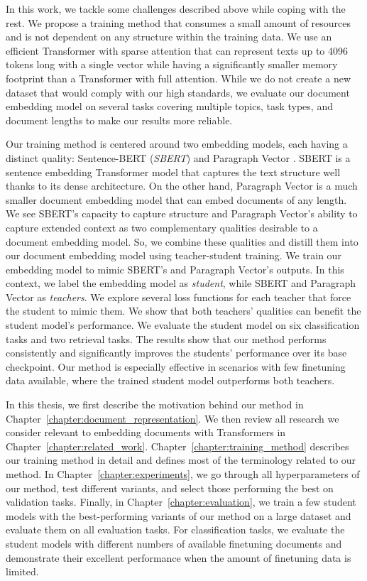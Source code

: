 In this work, we tackle some challenges described above while coping with the
rest. We propose a training method that consumes a small amount of resources
and is not dependent on any structure within the training data. We use an
efficient Transformer with sparse attention that can represent texts up to 4096
tokens long with a single vector while having a significantly smaller memory
footprint than a Transformer with full attention. While we do not create a new
dataset that would comply with our high standards, we evaluate our document
embedding model on several tasks covering multiple topics, task types, and
document lengths to make our results more reliable.

Our training method is centered around two embedding models, each having a
distinct quality: Sentence-BERT (\emph{SBERT}) \citep{reimers2019sentence} and
Paragraph Vector \citep{le2014distributed}. SBERT is a sentence embedding
Transformer model that captures the text structure well thanks to its dense
architecture. On the other hand, Paragraph Vector is a much smaller document
embedding model that can embed documents of any length. We see SBERT's capacity
to capture structure and Paragraph Vector's ability to capture extended context
as two complementary qualities desirable to a document embedding model. So, we
combine these qualities and distill them into our document embedding model
using teacher-student training. We train our embedding model to mimic SBERT's
and Paragraph Vector's outputs. In this context, we label the embedding model
as \emph{student}, while SBERT and Paragraph Vector as \emph{teachers}. We
explore several loss functions for each teacher that force the student to mimic
them. We show that both teachers' qualities can benefit the student model's
performance. We evaluate the student model on six classification tasks and two
retrieval tasks. The results show that our method performs consistently and
significantly improves the students' performance over its base checkpoint. Our
method is especially effective in scenarios with few finetuning data available,
where the trained student model outperforms both teachers.

In this thesis, we first describe the motivation behind our method in
Chapter~\ref{chapter:document_representation}. We then review all research we
consider relevant to embedding documents with Transformers in
Chapter~\ref{chapter:related_work}. Chapter~\ref{chapter:training_method}
describes our training method in detail and defines most of the terminology
related to our method. In Chapter~\ref{chapter:experiments}, we go through all
hyperparameters of our method, test different variants, and select those
performing the best on validation tasks. Finally, in
Chapter~\ref{chapter:evaluation}, we train a few student models with the
best-performing variants of our method on a large dataset and evaluate them on
all evaluation tasks. For classification tasks, we evaluate the student models
with different numbers of available finetuning documents and demonstrate their
excellent performance when the amount of finetuning data is limited.
